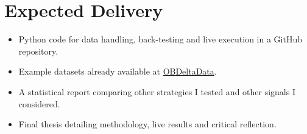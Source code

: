 \documentclass[a4paper,12pt]{article}
\newcommand{\datasetrepo}{https://github.com/AJslashTracey/OBDeltaData}
\begin{document}
\section{Expected Delivery}

\begin{itemize}
  \item Python code for data handling, back-testing and
        live execution in a GitHub repository.
  \item Example datasets already available at \href{\datasetrepo}{OBDeltaData}.
  \item A statistical report comparing other strategies I tested and other signals I considered.
  \item Final thesis detailing methodology, live results and
        critical reflection.
\end{itemize}

\end{document}
